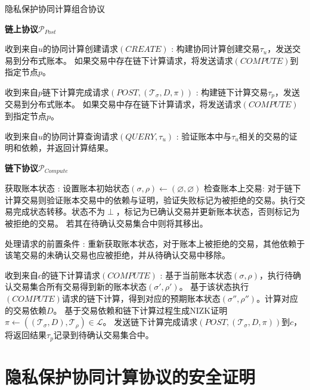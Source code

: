 \begin{breakablealgorithm}
    \caption{隐私保护协同计算组合协议}
    \label{alg:ch4-10}
    \begin{algorithmic} 
        \item [\textbf{链上协议$\mathcal{P}_{Post}$}] 
        \item[收到来自$u$的协同计算创建请求$(CREATE)$]:
        \STATE 构建协同计算创建交易$\tau_u$，发送交易到分布式账本。
        \STATE 如果交易中存在链下计算请求，将发送请求$(COMPUTE)$到指定节点$p$。
        \item[收到来自$p$链下计算完成请求$(POST, (\mathcal{T}_\sigma, D, \pi))$]:
        \STATE 构建链下计算交易$\tau_p$，发送交易到分布式账本。 
        \STATE 如果交易中存在链下计算请求，将发送请求$(COMPUTE)$到指定节点$p$。
        \item[收到来自$u$的协同计算查询请求$(QUERY, \tau_u)$]:
        \STATE 验证账本中与$\tau_u$相关的交易的证明和依赖，并返回计算结果。

        \noindent\hrulefill
        \item [\textbf{链下协议$\mathcal{P}_{Compute}$}] 
        \item[获取账本状态]: 
        \STATE 设置账本初始状态$(\sigma, \rho) \leftarrow (\varnothing, \varnothing)$
        \STATE 检查账本上交易: 对于链下计算交易则验证账本交易中的依赖与证明，验证失败标记为被拒绝的交易。执行交易完成状态转移。状态不为$\perp$，标记为已确认交易并更新账本状态，否则标记为被拒绝的交易。
        \STATE 若其在待确认交易集合中则将其移出。
        \item[处理请求的前置条件]: 
        \STATE 重新获取账本状态，对于账本上被拒绝的交易，其他依赖于该笔交易的未确认交易也应被拒绝，并从待确认交易中移除。
        \item[收到来自$c$的链下计算请求$(COMPUTE)$]:
        \STATE 基于当前账本状态$(\sigma, \rho)$，执行待确认交易集合所有交易得到新的账本状态$(\sigma', \rho')$。
        \STATE 基于该状态执行$(COMPUTE)$请求的链下计算，得到对应的预期账本状态$(\sigma'', \rho'')$。计算对应的交易依赖$D$。
        \STATE 基于交易依赖和链下计算过程生成NIZK证明$\pi \leftarrow ((\mathcal{T}_\sigma, D), \mathcal{T}_\rho) \in \mathcal{L}$。
        \STATE 发送链下计算完成请求$(POST,(\mathcal{T}_\sigma, D, \pi))$到$c$，将返回结果$\tau_p$记录到待确认交易集合中。
    \end{algorithmic}
\end{breakablealgorithm}

\section{隐私保护协同计算协议的安全证明}
